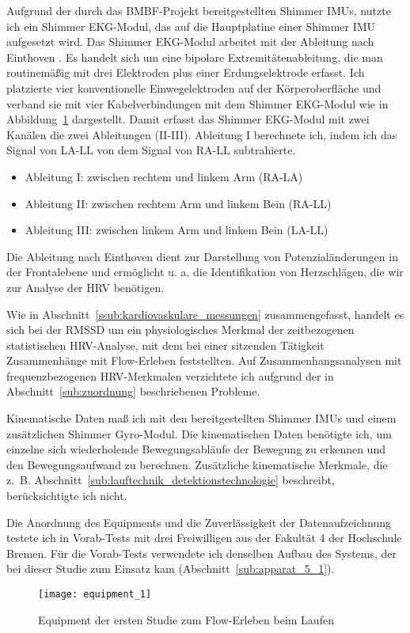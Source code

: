 Aufgrund der durch das \acs{BMBF}-Projekt bereitgestellten Shimmer \acp{IMU}, nutzte ich ein Shimmer \ac{EKG}-Modul, das auf die Hauptplatine einer Shimmer \ac{IMU} aufgesetzt wird. Das Shimmer \ac{EKG}-Modul arbeitet mit der Ableitung nach Einthoven \citep[][S.~85ff.]{Behrends2002}. Es handelt sich um eine bipolare Extremitätenableitung, die man routinemäßig mit drei Elektroden plus einer Erdungselektrode erfasst. Ich platzierte vier konventionelle Einwegelektroden auf der Körperoberfläche und verband sie mit vier Kabelverbindungen mit dem Shimmer \ac{EKG}-Modul wie in Abbildung~\ref{fig:equipment_1} dargestellt. Damit erfasst das Shimmer \ac{EKG}-Modul mit zwei Kanälen die zwei Ableitungen (II-III). Ableitung I berechnete ich, indem ich das Signal von LA-LL von dem Signal von RA-LL subtrahierte. 
\begin{itemize}
	\item Ableitung I: zwischen rechtem und linkem Arm (RA-LA) 
	\item Ableitung II: zwischen rechtem Arm und linkem Bein (RA-LL) 
	\item Ableitung III: zwischen linkem Arm und linkem Bein (LA-LL) 
\end{itemize}

Die Ableitung nach Einthoven dient zur Darstellung von Potenzialänderungen in der Frontalebene und ermöglicht u. a. die Identifikation von Herzschlägen, die wir zur Analyse der \ac{HRV} benötigen.

Wie in Abschnitt~\ref{ssub:kardiovaskulare_messungen} zusammengefasst, handelt es sich bei der \acs{RMSSD} um ein physiologisches Merkmal der zeitbezogenen statistischen \ac{HRV}-Analyse, mit dem \citet{Keller2011} bei einer sitzenden Tätigkeit Zusammenhänge mit Flow-Erleben feststellten. Auf Zusammenhangsanalysen mit frequenzbezogenen \ac{HRV}-Merkmalen verzichtete ich aufgrund der in Abschnitt~\ref{sub:zuordnung} beschriebenen Probleme.

Kinematische Daten maß ich mit den bereitgestellten Shimmer \acp{IMU} und einem zusätzlichen Shimmer Gyro-Modul. Die kinematischen Daten benötigte ich, um einzelne sich wiederholende Bewegungsabläufe der Bewegung zu erkennen und den Bewegungsaufwand zu berechnen. Zusätzliche kinematische Merkmale, die z.~B. Abschnitt~\ref{sub:lauftechnik_detektionstechnologie} beschreibt, berücksichtigte ich nicht.

Die Anordnung des Equipments und die Zuverlässigkeit der Datenaufzeichnung testete ich in Vorab-Tests mit drei Freiwilligen aus der Fakultät 4 der Hochschule Bremen. Für die Vorab-Tests verwendete ich denselben Aufbau des Systems, der bei dieser Studie zum Einsatz kam (Abschnitt~\ref{sub:apparat_5_1}). 
\begin{figure}
	[!htb] \centering 
	\texttt{[image: equipment\_1]} \caption[Equipment (Erste Studie: Laufen)]{Equipment der ersten Studie zum Flow-Erleben beim Laufen} \label{fig:equipment_1} 
\end{figure}

